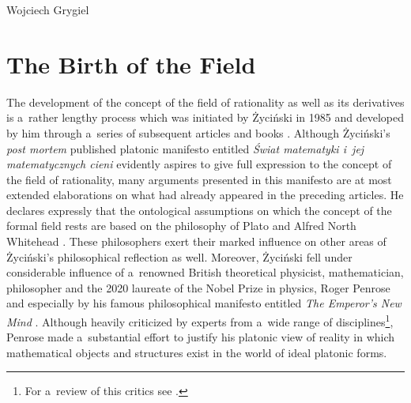 \begin{artengenv}{Wojciech Grygiel}
\section{The Birth of the Field}
The development of the concept of the field of rationality as well as its derivatives is a~rather lengthy process which was initiated by Życiński in 1985 and developed by him through a~series of subsequent articles and books
\parencites[][]{zycinski_teizm_1985}[][]{zycinski_filozoficzne_1987}[][]{zycinski_teizm_1988}[][]{zycinski_poza_1991}[][]{zycinski_status_1995}[][]{zycinski_pole_2006}[][]{zycinski_swiat_2013}. %
 Although Życiński's \textit{post mortem} published platonic manifesto entitled \textit{Świat matematyki i~jej matematycznych cieni} 
\parencites[][]{zycinski_swiat_2011}[][]{zycinski_swiat_2013} %
 evidently aspires to give full expression to the concept of the field of rationality, many arguments presented in this manifesto are at most extended elaborations on what had already appeared in the preceding articles. He declares expressly that the ontological assumptions on which the concept of the formal field rests are based on the philosophy of Plato and Alfred North Whitehead 
\parencite[][p.171]{zycinski_filozoficzne_1987}. %
 These philosophers exert their marked influence on other areas of Życiński's philosophical reflection as well. Moreover, Życiński fell under considerable influence of a~renowned British theoretical physicist, mathematician, philosopher and the 2020 laureate of the Nobel Prize in physics, Roger Penrose and especially by his famous philosophical manifesto entitled \textit{The Emperor's New Mind} 
\parencite*[][]{penrose_emperors_1989}. %
 Although heavily criticized by experts from a~wide range of disciplines\footnote{For a~review of this critics see 
\parencite[][]{grygiel_rogera_2009}.%
}, Penrose made a~substantial effort to justify his platonic view of reality in which mathematical objects and structures exist in the world of ideal platonic forms.


\end{artengenv}
